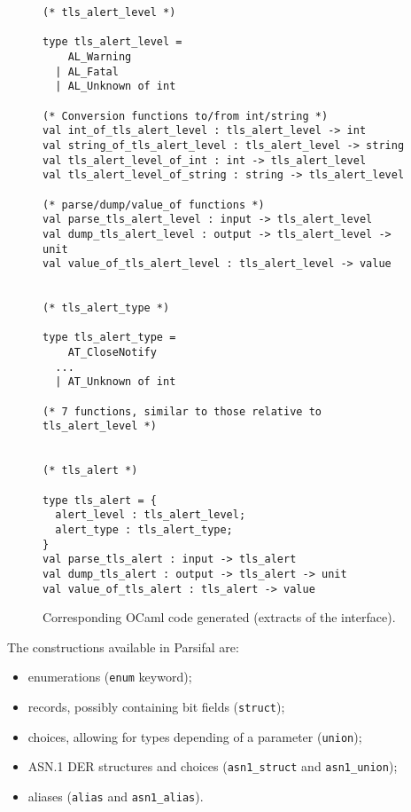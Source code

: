 \documentclass{article}
\begin{document}
\begin{figure}[p]
  \begin{center}\begin{minipage}{.61\linewidth}
    \begin{lstlisting}
(* tls_alert_level *)

type tls_alert_level =
    AL_Warning
  | AL_Fatal
  | AL_Unknown of int

(* Conversion functions to/from int/string *)
val int_of_tls_alert_level : tls_alert_level -> int
val string_of_tls_alert_level : tls_alert_level -> string
val tls_alert_level_of_int : int -> tls_alert_level
val tls_alert_level_of_string : string -> tls_alert_level

(* parse/dump/value_of functions *)
val parse_tls_alert_level : input -> tls_alert_level
val dump_tls_alert_level : output -> tls_alert_level -> unit
val value_of_tls_alert_level : tls_alert_level -> value


(* tls_alert_type *)

type tls_alert_type =
    AT_CloseNotify
  ...
  | AT_Unknown of int

(* 7 functions, similar to those relative to tls_alert_level *)


(* tls_alert *)

type tls_alert = {
  alert_level : tls_alert_level;
  alert_type : tls_alert_type;
}
val parse_tls_alert : input -> tls_alert
val dump_tls_alert : output -> tls_alert -> unit
val value_of_tls_alert : tls_alert -> value
    \end{lstlisting}
  \end{minipage}\end{center}
  \caption{Corresponding OCaml code generated (extracts of the interface).}
  \label{fig:tls-generated-code}
\end{figure}


The constructions available in Parsifal are:
\begin{itemize}
\item enumerations (\texttt{enum} keyword);
\item records, possibly containing bit fields (\texttt{struct});
\item choices, allowing for types depending of a parameter (\texttt{union});
\item ASN.1 DER structures and choices (\texttt{asn1\_struct} and \texttt{asn1\_union});
\item aliases (\texttt{alias} and \texttt{asn1\_alias}).
\end{itemize}
\end{document}
